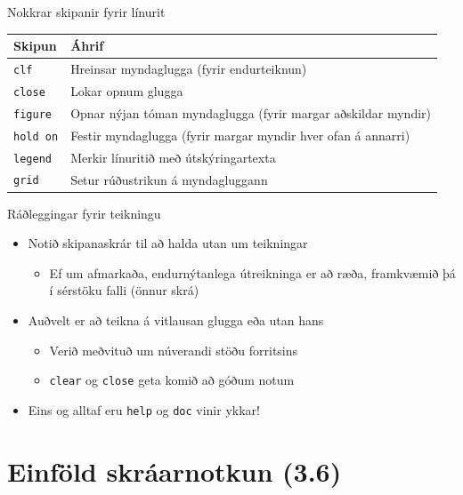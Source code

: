 \documentclass{beamer}
\begin{document}
\begin{frame}{Nokkrar skipanir fyrir línurit}
\begin{center}
\begin{tabular}{lp{8cm}}
\toprule
Skipun&Áhrif\\
\midrule
\texttt{clf}&Hreinsar myndaglugga (fyrir endurteiknun)\\
\texttt{close}&Lokar opnum glugga\\
\texttt{figure}&Opnar nýjan tóman myndaglugga (fyrir margar aðskildar myndir)\\
\texttt{hold on}&Festir myndaglugga (fyrir margar myndir hver ofan á annarri)\\
\texttt{legend}&Merkir línuritið með útskýringartexta\\
\texttt{grid}&Setur rúðustrikun á myndagluggann\\
\bottomrule
\end{tabular}
\end{center}

\end{frame}

\begin{frame}{Ráðleggingar fyrir teikningu}
\begin{itemize}
 \item Notið skipanaskrár til að halda utan um teikningar
 \begin{itemize}
  \item Ef um afmarkaða, endurnýtanlega útreikninga er að ræða, framkvæmið þá í sérstöku falli (önnur skrá)
 \end{itemize}
 \item Auðvelt er að teikna á vitlausan glugga eða utan hans
 \begin{itemize}
  \item Verið meðvituð um núverandi stöðu forritsins
  \item \texttt{clear} og \texttt{close} geta komið að góðum notum
 \end{itemize}
 \item Eins og alltaf eru \texttt{help} og \texttt{doc} vinir ykkar!
\end{itemize}
\end{frame}

\section{Einföld skráarnotkun (3.6)}
\end{document}
